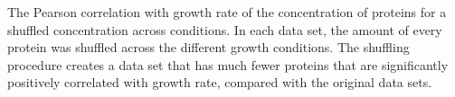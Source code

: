 \label{fig:shuffledcorr}
The Pearson correlation with growth rate of the concentration of proteins for a shuffled concentration across conditions.
In each data set, the amount of every protein was shuffled across the different growth conditions.
The shuffling procedure creates a data set that has much fewer proteins that are significantly positively correlated with growth rate, compared with the original data sets.